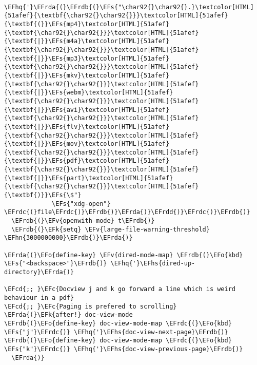 \documentclass[a4wide,10pt]{article}
\newcommand{\EFc}[1]{\textcolor{EFc}{#1}} %
\newcommand{\EFcd}[1]{\textcolor{EFcd}{#1}} %
\newcommand{\EFs}[1]{\textcolor{EFs}{#1}} %
\newcommand{\EFk}[1]{\textcolor{EFk}{#1}} %
\newcommand{\EFv}[1]{\textcolor{EFv}{#1}} %
\newcommand{\EFo}[1]{\textcolor{EFo}{#1}} %
\newcommand{\EFhn}[1]{\textcolor{EFhn}{\textbf{#1}}} %
\newcommand{\EFhq}[1]{\textcolor{EFhq}{#1}} %
\newcommand{\EFhs}[1]{\textcolor{EFhs}{#1}} %
\newcommand{\EFrda}[1]{\textcolor{EFrda}{#1}} %
\newcommand{\EFrdb}[1]{\textcolor{EFrdb}{#1}} %
\newcommand{\EFrdc}[1]{\textcolor{EFrdc}{#1}} %
\newcommand{\EFrdd}[1]{\textcolor{EFrdd}{#1}} %
\begin{document}
\begin{Code}
\begin{Verbatim}
          \EFhq{'}\EFrda{(}\EFrdb{(}\EFs{"\char92{}\char92{}.}\textcolor[HTML]{51afef}{\textbf{\char92{}\char92{}}}\textcolor[HTML]{51afef}{\textbf{(}}\EFs{mp4}\textcolor[HTML]{51afef}{\textbf{\char92{}\char92{}}}\textcolor[HTML]{51afef}{\textbf{|}}\EFs{m4a}\textcolor[HTML]{51afef}{\textbf{\char92{}\char92{}}}\textcolor[HTML]{51afef}{\textbf{|}}\EFs{mp3}\textcolor[HTML]{51afef}{\textbf{\char92{}\char92{}}}\textcolor[HTML]{51afef}{\textbf{|}}\EFs{mkv}\textcolor[HTML]{51afef}{\textbf{\char92{}\char92{}}}\textcolor[HTML]{51afef}{\textbf{|}}\EFs{webm}\textcolor[HTML]{51afef}{\textbf{\char92{}\char92{}}}\textcolor[HTML]{51afef}{\textbf{|}}\EFs{avi}\textcolor[HTML]{51afef}{\textbf{\char92{}\char92{}}}\textcolor[HTML]{51afef}{\textbf{|}}\EFs{flv}\textcolor[HTML]{51afef}{\textbf{\char92{}\char92{}}}\textcolor[HTML]{51afef}{\textbf{|}}\EFs{mov}\textcolor[HTML]{51afef}{\textbf{\char92{}\char92{}}}\textcolor[HTML]{51afef}{\textbf{|}}\EFs{pdf}\textcolor[HTML]{51afef}{\textbf{\char92{}\char92{}}}\textcolor[HTML]{51afef}{\textbf{|}}\EFs{part}\textcolor[HTML]{51afef}{\textbf{\char92{}\char92{}}}\textcolor[HTML]{51afef}{\textbf{)}}\EFs{\$"}
             \EFs{"xdg-open"} \EFrdc{(}file\EFrdc{)}\EFrdb{)}\EFrda{)}\EFrdd{)}\EFrdc{)}\EFrdb{)}
  \EFrdb{(}\EFv{openwith-mode} t\EFrdb{)}
  \EFrdb{(}\EFk{setq} \EFv{large-file-warning-threshold} \EFhn{3000000000}\EFrdb{)}\EFrda{)}

\EFrda{(}\EFo{define-key} \EFv{dired-mode-map} \EFrdb{(}\EFo{kbd} \EFs{"<backspace>"}\EFrdb{)} \EFhq{'}\EFhs{dired-up-directory}\EFrda{)}

\EFcd{;; }\EFc{Docview j and k go forward a line which is weird behaviour in a pdf}
\EFcd{;; }\EFc{Paging is prefered to scrolling}
\EFrda{(}\EFk{after!} doc-view-mode
\EFrdb{(}\EFo{define-key} doc-view-mode-map \EFrdc{(}\EFo{kbd} \EFs{"j"}\EFrdc{)} \EFhq{'}\EFhs{doc-view-next-page}\EFrdb{)}
\EFrdb{(}\EFo{define-key} doc-view-mode-map \EFrdc{(}\EFo{kbd} \EFs{"k"}\EFrdc{)} \EFhq{'}\EFhs{doc-view-previous-page}\EFrdb{)}
  \EFrda{)}


\end{Verbatim}
\end{Code}
\end{document}

